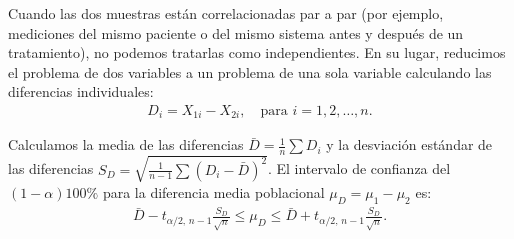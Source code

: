 \begin{definicion}
	Cuando las dos muestras están correlacionadas par a par (por ejemplo, mediciones del mismo paciente o del mismo sistema antes y después de un tratamiento), no podemos tratarlas como independientes. En su lugar, reducimos el problema de dos variables a un problema de una sola variable calculando las diferencias individuales:
	\begin{align}
		D_i = X_{1i} - X_{2i}, \quad \text{para } i = 1, 2, \ldots, n.
	\end{align}

	Calculamos la media de las diferencias $\bar{D} = \frac{1}{n}\sum D_i$ y la desviación estándar de las diferencias $S_D = \sqrt{\frac{1}{n-1}\sum (D_i - \bar{D})^2}$. El intervalo de confianza del $(1-\alpha)100\%$ para la diferencia media poblacional $\mu_D = \mu_1 - \mu_2$ es:
	\begin{align}
		\bar{D} - t_{\alpha/2, \, n-1} \frac{S_D}{\sqrt{n}} \leq \mu_D \leq \bar{D} + t_{\alpha/2, \, n-1} \frac{S_D}{\sqrt{n}}.
	\end{align}
\end{definicion}

